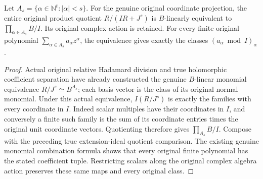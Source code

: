 \begin{theorem}
\label{hir:actual-product-normal-truncation-entire-coefficient-quotient}
\leanok
Let $A_s=\{\alpha\in\mathbb N^t:|\alpha|<s\}$. For the genuine original
coordinate projection, the entire original product quotient
$R/(IR+J^s)$ is $B$-linearly equivalent to
$\prod_{\alpha\in A_s}B/I$. Its original complex action is retained.
For every finite original polynomial $\sum_{\alpha\in A_s}a_\alpha z^\alpha$,
the equivalence gives exactly the classes $(a_\alpha\bmod I)_\alpha$.
\end{theorem}
\begin{proof}
Actual original relative Hadamard division and true holomorphic
coefficient separation have already constructed the genuine $B$-linear
monomial equivalence $R/J^s\simeq B^{A_s}$; each basis vector is the class
of its original normal monomial. Under this actual equivalence, $I(R/J^s)$
is exactly the families with every coordinate in $I$. Indeed scalar
multiples have their coordinates in $I$, and conversely a finite such
family is the sum of its coordinate entries times the original unit
coordinate vectors. Quotienting therefore gives $\prod_{A_s}B/I$.
Compose with the preceding true extension-ideal quotient comparison.
The existing genuine monomial combination formula shows that every
original finite polynomial has the stated coefficient tuple. Restricting
scalars along the original complex algebra action preserves these same
maps and every original class.
\end{proof}

